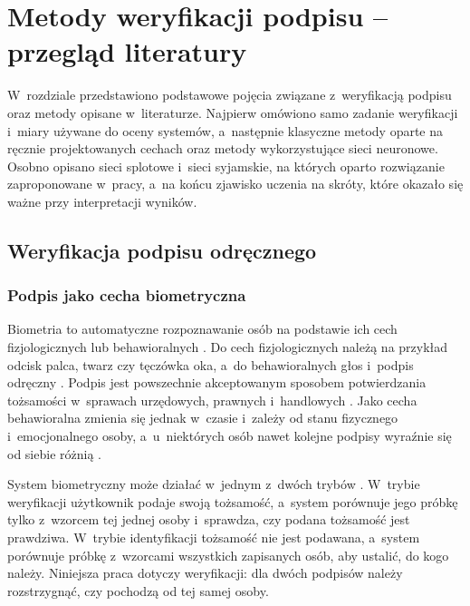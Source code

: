 \documentclass[12pt, twoside, openright]{article}
\begin{document}
\section{Metody weryfikacji podpisu -- przegląd literatury}
\label{Sec:literatura}

W~rozdziale przedstawiono podstawowe pojęcia związane z~weryfikacją podpisu oraz metody opisane w~literaturze.
Najpierw omówiono samo zadanie weryfikacji i~miary używane do oceny systemów, a~następnie klasyczne metody oparte na ręcznie projektowanych cechach oraz metody wykorzystujące sieci neuronowe.
Osobno opisano sieci splotowe i~sieci syjamskie, na których oparto rozwiązanie zaproponowane w~pracy, a~na końcu zjawisko uczenia na skróty, które okazało się ważne przy interpretacji wyników.

\subsection{Weryfikacja podpisu odręcznego}
\label{Subsec:weryfikacja}

\subsubsection*{Podpis jako cecha biometryczna}

Biometria to automatyczne rozpoznawanie osób na podstawie ich cech fizjologicznych lub behawioralnych \cite{jain2004}.
Do cech fizjologicznych należą na przykład odcisk palca, twarz czy tęczówka oka, a~do behawioralnych głos i~podpis odręczny \cite{hafemann2017review}.
Podpis jest powszechnie akceptowanym sposobem potwierdzania tożsamości w~sprawach urzędowych, prawnych i~handlowych \cite{jain2004}.
Jako cecha behawioralna zmienia się jednak w~czasie i~zależy od stanu fizycznego i~emocjonalnego osoby, a~u~niektórych osób nawet kolejne podpisy wyraźnie się od siebie różnią \cite{jain2004}.

System biometryczny może działać w~jednym z~dwóch trybów \cite{jain2004}.
W~trybie weryfikacji użytkownik podaje swoją tożsamość, a~system porównuje jego próbkę tylko z~wzorcem tej jednej osoby i~sprawdza, czy podana tożsamość jest prawdziwa.
W~trybie identyfikacji tożsamość nie jest podawana, a~system porównuje próbkę z~wzorcami wszystkich zapisanych osób, aby ustalić, do kogo należy.
Niniejsza praca dotyczy weryfikacji: dla dwóch podpisów należy rozstrzygnąć, czy pochodzą od tej samej osoby.
\end{document}
